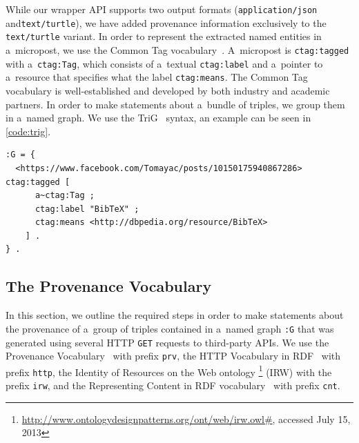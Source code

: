 While our wrapper API supports two output formats
(\texttt{application/json} and\linebreak \texttt{text/turtle}),
we have added provenance information exclusively to the
\texttt{text/turtle} variant.
In order to represent the extracted named entities in a~micropost,
we use the Common Tag vocabulary~\cite{tori2009commontag}.
A~micropost is \texttt{ctag:tagged} with a~\texttt{ctag:Tag},
which consists of a~textual \texttt{ctag:label} and a~pointer
to a~resource that specifies what the label \texttt{ctag:means}.
The Common Tag vocabulary is well-established and developed by
both industry and academic partners.
In order to make statements about a~bundle of triples,
we group them in a~named graph.
We use the TriG~\cite{bizer2007trig} syntax,
an example can be seen in \autoref{code:trig}.

\begin{lstlisting}[caption={Example named graph in TriG syntax},
  label={code:trig}]
:G = {
  <https://www.facebook.com/Tomayac/posts/10150175940867286> ctag:tagged [
      a~ctag:Tag ;
      ctag:label "BibTeX" ;
      ctag:means <http://dbpedia.org/resource/BibTeX>
    ] .
} .
\end{lstlisting}

\subsection{The Provenance Vocabulary}
\label{sec:provenance}

In this section, we outline the required steps
in order to make statements about the provenance
of a~group of triples contained in a~named graph
\texttt{:G} that was generated using several HTTP \texttt{GET}
requests to third-party APIs.
We use the Provenance Vocabulary~\cite{hartig2012provenance} with
prefix \texttt{prv}, the HTTP Vocabulary in RDF~\cite{koch2011http}
with prefix \texttt{http},
the Identity of Resources on the Web ontology%
\footnote{\url{http://www.ontologydesignpatterns.org/ont/web/irw.owl\#},
accessed July 15, 2013} (IRW)
with the prefix \texttt{irw},
and the Representing Content in RDF
vocabulary~\cite{koch2011content} with prefix \texttt{cnt}.

